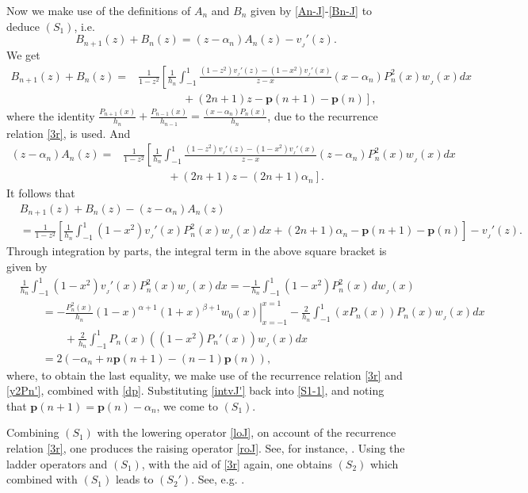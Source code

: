 \documentclass[12pt,a4paper]{article}    %
\numberwithin{equation}{section}
\begin{document}
Now we make use of the definitions of $A_n$ and $B_n$ given by \eqref{An-J}-\eqref{Bn-J} to deduce $(S_1)$, i.e.	 \[B_{n+1}(z)+B_n(z)=(z-\alpha_n)A_n(z)-v_{_J}'(z).\]
We get
\begin{align*}		 B_{n+1}(z)+B_n(z)=&\frac{1}{1-z^2}\left[\frac{1}{h_n}\int_{-1}^{1}\frac{(1-z^2)v_{_J}'(z)-(1-x^2)v_{_J}'(x)}{z-x}(x-\alpha_n)P_n^2(x)w_{_J}(x)dx\right.\nonumber\\
&\left.\qquad\qquad+(2n+1)z-\mathbf{p}(n+1)-\mathbf{p}(n)\right],		 \end{align*}	
where the identity $\frac{P_{n+1}(x)}{h_n}+\frac{P_{n-1}(x)}{h_{n-1}}=\frac{(x-\alpha_n)P_n(x)}{h_n}$, due to the recurrence relation \eqref{3r}, is used. And
\begin{align*}
(z-\alpha_n)A_n(z)=&\frac{1}{1-z^2}\left[\frac{1}{h_n}\int_{-1}^{1}\frac{(1-z^2)v_{_J}'(z)-(1-x^2)v_{_J}'(x)}{z-x}(z-\alpha_n)P_n^2(x)w_{_J}(x)dx\right.\nonumber\\
 &\left.\qquad\qquad+(2n+1)z-(2n+1)\alpha_n\right].
\end{align*}
It follows that
\begin{align}	
 &B_{n+1}(z)+B_n(z)-(z-\alpha_n)A_n(z)\nonumber\\
&=\frac{1}{1-z^2}\left[\frac{1}{h_n}\int_{-1}^{1}(1-x^2)v_{_J}'(x)P_n^2(x)w_{_J}(x)dx	 +(2n+1)\alpha_n-\mathbf{p}(n+1)-\mathbf{p}(n)\right]-v_{_J}'(z).\label{S1-1}
\end{align}
Through integration by parts, the integral term in the above square bracket is given by
\begin{align}		 &\frac{1}{h_n}\int_{-1}^{1}(1-x^2)v_{_J}'(x)P_n^2(x)w_{_J}(x)dx=-\frac{1}{h_n}\int_{-1}^{1}(1-x^2)P_n^2(x)\,dw_{_J}(x)\nonumber\\ &\qquad=-\frac{P_n^2(x)}{h_n}\left.(1-x)^{\alpha+1}(1+x)^{\beta+1}w_0(x)\right|_{x=-1}^{x=1}-\frac{2 }{h_n}\int_{-1}^{1}\left(xP_n(x)\right)P_n(x)w_{_J}(x)dx\nonumber\\
&\qquad\qquad+\frac{2}{h_n}\int_{-1}^{1}P_n(x)\left((1-x^2)P_n'(x)\right)w_{_J}(x)dx\nonumber\\
&\qquad=2\left(-\alpha_n+n\mathbf{p}(n+1)-(n-1)\mathbf{p}(n)\right),\label{intvJ'}
\end{align}
where, to obtain the last equality, we make use of the recurrence relation \eqref{3r} and  \eqref{y2Pn'}, combined with \eqref{dp}. Substituting \eqref{intvJ'} back into \eqref{S1-1}, and noting that $\textbf{p}(n+1)=\textbf{p}(n)-\alpha_n$, we come to $(S_1)$.

Combining $(S_1)$ with the lowering operator \eqref{loJ}, on account of the recurrence relation \eqref{3r}, one produces the raising operator \eqref{roJ}. See, for instance, \cite[Theorem 2.3]{MinFang25}. Using the ladder operators and $(S_1)$, with the aid of \eqref{3r} again, one obtains $(S_2)$ which combined with $(S_1)$ leads to $(S_2')$. See, e.g. \cite[Theorem 4.2]{WvA18}.
\end{document}
